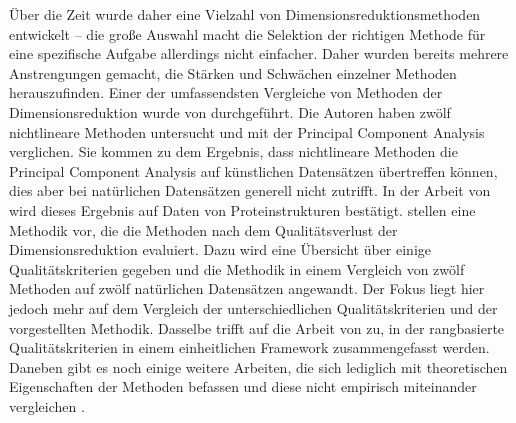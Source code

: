 Über die Zeit wurde daher eine Vielzahl von Dimensionsreduktionsmethoden entwickelt \parencite[siehe z.B.][]{Lee.2007} -- die große Auswahl macht die Selektion der richtigen Methode für
eine spezifische Aufgabe allerdings nicht einfacher. Daher wurden bereits mehrere Anstrengungen
gemacht, die Stärken und Schwächen einzelner Methoden herauszufinden. Einer der umfassendsten
Vergleiche von Methoden der Dimensionsreduktion wurde von \Textcite{vanderMaaten.2009}
durchgeführt. Die Autoren haben zwölf nichtlineare Methoden untersucht und mit der Principal
Component Analysis verglichen. Sie kommen zu dem Ergebnis, dass nichtlineare Methoden die Principal
Component Analysis auf künstlichen Datensätzen übertreffen können, dies aber bei natürlichen
Datensätzen generell nicht zutrifft. In der Arbeit von \textcite{RohanPandit.2016} wird dieses
Ergebnis auf Daten von Proteinstrukturen bestätigt. \Textcite{Gracia.2014} stellen eine Methodik
vor, die die Methoden nach dem Qualitätsverlust der Dimensionsreduktion evaluiert. Dazu wird eine
Übersicht über einige Qualitätskriterien gegeben und die Methodik in einem Vergleich von zwölf
Methoden auf zwölf natürlichen Datensätzen angewandt. Der Fokus liegt hier jedoch mehr auf dem
Vergleich der unterschiedlichen Qualitätskriterien und der vorgestellten Methodik. Dasselbe trifft
auf die Arbeit von \textcite{Lee.2009} zu, in der rangbasierte Qualitätskriterien in einem
einheitlichen Framework zusammengefasst werden. Daneben gibt es noch einige weitere Arbeiten, die
sich lediglich mit theoretischen Eigenschaften der Methoden befassen und diese nicht empirisch
miteinander vergleichen \parencites{Cunningham.2014}{Sorzano.2014}{Lee.2007}{Sarveniazi.2014}{Burges.2009b}.

